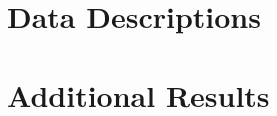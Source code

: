\documentclass{article}
\begin{document}

\appendix

\section{Data Descriptions}
\label{app:data_descriptions}

\section{Additional Results}
\label{app:additional_results}



\end{document}
